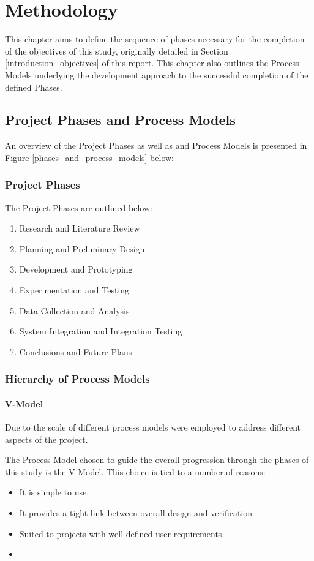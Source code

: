 \chapter{Methodology}\label{methodology}
This chapter aims to define the sequence of phases necessary for the completion
of the objectives of this study, originally detailed in Section
\ref{introduction_objectives} of this report.
This chapter also outlines the Process Models underlying the development
approach to the successful completion of the defined Phases.

\section{Project Phases and Process Models}
An overview of the Project Phases as well as and Process Models is presented in
Figure \ref{phases_and_process_models} below:

\subsection{Project Phases}
The Project Phases are outlined below:
\begin{enumerate}
    \item Research and Literature Review
    \item Planning and Preliminary Design
    \item Development and Prototyping 
    \item Experimentation and Testing
    \item Data Collection and Analysis
    \item System Integration and Integration Testing
    \item Conclusions and Future Plans
\end{enumerate}

\subsection{Hierarchy of Process Models}
\subsubsection{V-Model}
Due to the scale of different process models were employed to address different
aspects of the project.

The Process Model chosen to guide the overall progression through the phases of
this study is the V-Model. This choice is tied to a number of reasons: 
\begin{itemize}
    \item It is simple to use.
    \item It provides a tight link between overall design and verification 
    \item Suited to projects with well defined user requirements.
    \item
\end{itemize}

